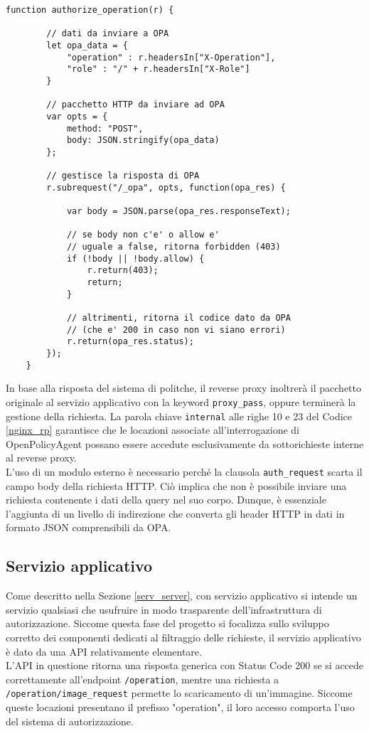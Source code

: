 \begin{lstlisting}[caption={Frammento di codice del modulo NJS},captionpos=b,label=NJS]
    function authorize_operation(r) {

        // dati da inviare a OPA
        let opa_data = {
            "operation" : r.headersIn["X-Operation"],
            "role" : "/" + r.headersIn["X-Role"]
        }
    
        // pacchetto HTTP da inviare ad OPA
        var opts = {
            method: "POST",
            body: JSON.stringify(opa_data)
        };
        
        // gestisce la risposta di OPA
        r.subrequest("/_opa", opts, function(opa_res) {
    
            var body = JSON.parse(opa_res.responseText);
            
            // se body non c'e' o allow e' 
            // uguale a false, ritorna forbidden (403)
            if (!body || !body.allow) {
                r.return(403);
                return;
            }

            // altrimenti, ritorna il codice dato da OPA 
            // (che e' 200 in caso non vi siano errori)
            r.return(opa_res.status);
        });
    }
\end{lstlisting}
In base alla risposta del sistema di politche, il reverse proxy inoltrerà il pacchetto originale al servizio applicativo con la keyword \texttt{proxy\_pass}, 
oppure terminerà la gestione della richiesta.
La parola chiave \texttt{internal} alle righe 10 e 23 del Codice \ref{nginx_rp}  garantisce che le locazioni 
associate all'interrogazione di OpenPolicyAgent possano essere accedute esclusivamente da sottorichieste interne al reverse proxy. 
\\ L'uso di un modulo esterno è necessario perché la clausola \texttt{auth\_request} scarta il campo body della 
richiesta HTTP. Ciò implica che non è possibile inviare una richiesta contenente i dati della query nel suo corpo.
Dunque, è essenziale l'aggiunta di un livello di indirezione che converta gli header HTTP in dati in formato
JSON comprensibili da OPA. 


\subsection{Servizio applicativo}
Come descritto nella Sezione \ref*{serv_server}, con servizio applicativo si intende un servizio qualsiasi che usufruire in modo trasparente 
dell'infrastruttura di autorizzazione. 
Siccome questa fase del progetto si focalizza sullo sviluppo corretto dei componenti dedicati 
al filtraggio delle richieste, il servizio applicativo è dato da una API relativamente elementare. \\
L'API in questione ritorna una risposta generica con Status Code 200 se si accede correttamente all'endpoint \texttt{/operation}, 
mentre una richiesta a \texttt{/operation/image\_request} permette lo scaricamento di 
un'immagine. Siccome queste locazioni presentano il prefisso "operation", il loro accesso comporta l'uso 
del sistema di autorizzazione.  

